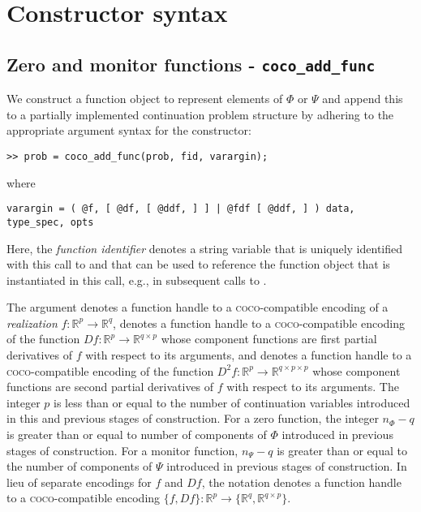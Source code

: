 \section{Constructor syntax}

\subsection{Zero and monitor functions - \texttt{coco\_add\_func}}
We construct a function object to represent elements of $\Phi$ or $\Psi$ and append this to a partially implemented continuation problem structure  by adhering to the appropriate argument syntax for the  constructor:
\begin{lstlisting}[language=coco-highlight]
>> prob = coco_add_func(prob, fid, varargin);
\end{lstlisting}
where
\begin{lstlisting}[language=coco-highlight]
varargin = ( @f, [ @df, [ @ddf, ] ] | @fdf [ @ddf, ] ) data, type_spec, opts
\end{lstlisting}
Here, the \emph{function identifier}  denotes a string variable that is uniquely identified with this call to  and that can be used to reference the function object that is instantiated in this call, e.g., in subsequent calls to .

The argument  denotes a function handle to a \textsc{coco}-compatible encoding of a \emph{realization}  $f:\mathbb{R}^{p}\rightarrow\mathbb{R}^{q}$,  denotes a function handle to a \textsc{coco}-compatible encoding of the function $Df:\mathbb{R}^{p}\rightarrow\mathbb{R}^{q\times p}$ whose component functions are first partial derivatives of $f$ with respect to its arguments, and  denotes a function handle to a \textsc{coco}-compatible encoding of the function $D^2f:\mathbb{R}^{p}\rightarrow\mathbb{R}^{q\times p\times p}$ whose component functions are second partial derivatives of $f$ with respect to its arguments. The integer $p$ is less than or equal to the number of continuation variables introduced in this and previous stages of construction. For a zero function, the integer $n_\Phi-q$ is greater than or equal to number of components of $\Phi$ introduced in previous stages of construction. For a monitor function, $n_\Psi-q$ is greater than or equal to the number of components of $\Psi$ introduced in previous stages of construction. In lieu of separate encodings for $f$ and $Df$, the notation  denotes a function handle to a \textsc{coco}-compatible encoding $\{f,Df\}:\mathbb{R}^p\rightarrow\{\mathbb{R}^{q},\mathbb{R}^{q\times p}\}$.

